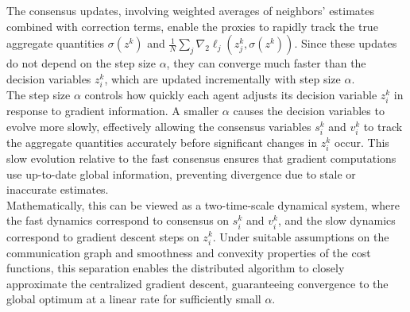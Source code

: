 \begin{center}
\end{center}

\noindent The consensus updates, involving weighted averages of neighbors' estimates combined with correction terms, enable the proxies to rapidly track the true aggregate quantities \(\sigma(z^k)\) and \( \frac{1}{N}\sum_j \nabla_2 \ell_j(z_j^k, \sigma(z^k))\). Since these updates do not depend on the step size \(\alpha\), they can converge much faster than the decision variables \(z_i^k\), which are updated incrementally with step size \(\alpha\). \\
The step size \(\alpha\) controls how quickly each agent adjusts its decision variable \(z_i^k\) in response to gradient information. A smaller \(\alpha\) causes the decision variables to evolve more slowly, effectively allowing the consensus variables \(s_i^k\) and \(v_i^k\) to track the aggregate quantities accurately before significant changes in \(z_i^k\) occur. This slow evolution relative to the fast consensus ensures that gradient computations use up-to-date global information, preventing divergence due to stale or inaccurate estimates. \\
Mathematically, this can be viewed as a two-time-scale dynamical system, where the fast dynamics correspond to consensus on \(s_i^k\) and \(v_i^k\), and the slow dynamics correspond to gradient descent steps on \(z_i^k\). Under suitable assumptions on the communication graph and smoothness and convexity properties of the cost functions, this separation enables the distributed algorithm to closely approximate the centralized gradient descent, guaranteeing convergence to the global optimum at a linear rate for sufficiently small \(\alpha\). \cite{carnevale2025unifyingtheoryframeworkdistributed}

